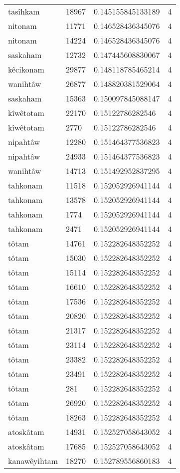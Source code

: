 \begin{longtable}{llll}
tasîhkam & 18967 & 0.145155845133189 & 4 \\
nitonam & 11771 & 0.146528436345076 & 4 \\
nitonam & 14224 & 0.146528436345076 & 4 \\
saskaham & 12732 & 0.147445608830067 & 4 \\
kêcikonam & 29877 & 0.148118785465214 & 4 \\
wanihtâw & 26877 & 0.148820381529064 & 4 \\
saskaham & 15363 & 0.150097845088147 & 4 \\
kîwêtotam & 22170 & 0.15122786282546 & 4 \\
kîwêtotam & 2770 & 0.15122786282546 & 4 \\
nipahtâw & 12280 & 0.151464377536823 & 4 \\
nipahtâw & 24933 & 0.151464377536823 & 4 \\
wanihtâw & 14713 & 0.151492952837295 & 4 \\
tahkonam & 11518 & 0.152052926941144 & 4 \\
tahkonam & 13578 & 0.152052926941144 & 4 \\
tahkonam & 1774 & 0.152052926941144 & 4 \\
tahkonam & 2471 & 0.152052926941144 & 4 \\
tôtam & 14761 & 0.152282648352252 & 4 \\
tôtam & 15030 & 0.152282648352252 & 4 \\
tôtam & 15114 & 0.152282648352252 & 4 \\
tôtam & 16610 & 0.152282648352252 & 4 \\
tôtam & 17536 & 0.152282648352252 & 4 \\
tôtam & 20820 & 0.152282648352252 & 4 \\
tôtam & 21317 & 0.152282648352252 & 4 \\
tôtam & 23114 & 0.152282648352252 & 4 \\
tôtam & 23382 & 0.152282648352252 & 4 \\
tôtam & 23491 & 0.152282648352252 & 4 \\
tôtam & 281 & 0.152282648352252 & 4 \\
tôtam & 26920 & 0.152282648352252 & 4 \\
tôtam & 18263 & 0.152282648352252 & 4 \\
atoskâtam & 14931 & 0.152527058643052 & 4 \\
atoskâtam & 17685 & 0.152527058643052 & 4 \\
kanawêyihtam & 18270 & 0.152789556860183 & 4 \\

\end{longtable}
